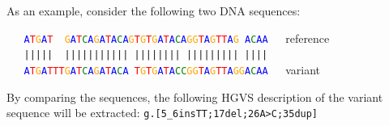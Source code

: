 \documentclass[final, slidestop]{beamer}
\begin{document}
\begin{frame}{}
\begin{myPoster}
{      \vspace{1cm}

      As an example, consider the following two DNA sequences:

      \vspace{1cm}

      \texttt{~~~\textcolor{blue}{A}\textcolor{red}{T}\textcolor{orange}{G}\textcolor{blue}{A}\textcolor{red}{T}~~\textcolor{orange}{G}\textcolor{blue}{A}\textcolor{red}{T}\textcolor{green}{C}\textcolor{blue}{A}\textcolor{orange}{G}\textcolor{blue}{A}\textcolor{red}{T}\textcolor{blue}{A}\textcolor{green}{C}\textcolor{blue}{A}\textcolor{orange}{G}\textcolor{red}{T}\textcolor{orange}{G}\textcolor{red}{T}\textcolor{orange}{G}\textcolor{blue}{A}\textcolor{red}{T}\textcolor{blue}{A}\textcolor{green}{C}\textcolor{blue}{A}\textcolor{orange}{G}\textcolor{orange}{G}\textcolor{red}{T}\textcolor{blue}{A}\textcolor{orange}{G}\textcolor{red}{T}\textcolor{red}{T}\textcolor{blue}{A}\textcolor{orange}{G}~\textcolor{blue}{A}\textcolor{green}{C}\textcolor{blue}{A}\textcolor{blue}{A}~~~}reference\\
      \texttt{~~~|||||~~|||||||||||~||||||||~|||||||||~||||}\\
      \texttt{~~~\textcolor{blue}{A}\textcolor{red}{T}\textcolor{orange}{G}\textcolor{blue}{A}\textcolor{red}{T}\textcolor{red}{T}\textcolor{red}{T}\textcolor{orange}{G}\textcolor{blue}{A}\textcolor{red}{T}\textcolor{green}{C}\textcolor{blue}{A}\textcolor{orange}{G}\textcolor{blue}{A}\textcolor{red}{T}\textcolor{blue}{A}\textcolor{green}{C}\textcolor{blue}{A}~\textcolor{red}{T}\textcolor{orange}{G}\textcolor{red}{T}\textcolor{orange}{G}\textcolor{blue}{A}\textcolor{red}{T}\textcolor{blue}{A}\textcolor{green}{C}\textcolor{green}{C}\textcolor{orange}{G}\textcolor{orange}{G}\textcolor{red}{T}\textcolor{blue}{A}\textcolor{orange}{G}\textcolor{red}{T}\textcolor{red}{T}\textcolor{blue}{A}\textcolor{orange}{G}\textcolor{orange}{G}\textcolor{blue}{A}\textcolor{green}{C}\textcolor{blue}{A}\textcolor{blue}{A}~~~}variant

      \vspace{1cm}

      By comparing the sequences, the following HGVS description of the variant
      sequence will be extracted: \texttt{g.[5\_6insTT;17del;26A>C;35dup]}

      \vspace{1cm}

}
\end{myPoster}
\end{frame}
\end{document}

